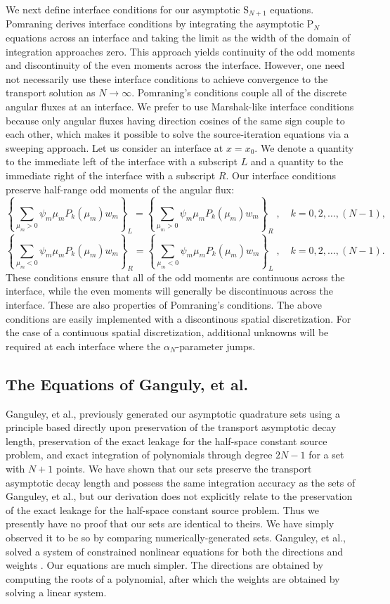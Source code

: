 \documentclass[12pt]{article}
\newcommand{\bracet}[1]{\left\{ #1 \right\}}
\newcommand{\be}{\begin{equation}}
\newcommand{\ee}{\end{equation}}
\newcommand{\pec}{\; ,}
\newcommand{\LEQ}[1]{\label{eq:#1}}
\newcommand{\bc}{\begin{center}}
\newcommand{\ec}{\end{center}}
\begin{document}
We next define interface conditions for our asymptotic S$_{N+1}$ equations.  Pomraning derives interface conditions  
by integrating the asymptotic P$_N$ equations across an interface and taking the limit as the width of the domain of 
integration approaches zero.  This approach yields continuity of the odd moments and discontinuity of the even moments across the 
interface.  However, one need not necessarily use these interface conditions to achieve convergence to the transport solution as 
$N \rightarrow \infty$.  Pomraning's conditions couple all of the discrete angular fluxes at an interface.  We prefer to use 
Marshak-like interface conditions because only angular fluxes having direction cosines of the same sign couple to each other, which makes 
it possible to solve the source-iteration equations via a sweeping approach. Let us consider an interface at $x=x_0$.  We denote a 
quantity to the immediate left of the interface with a subscript $L$ and a quantity to the immediate right of the interface with a 
subscript $R$. Our interface conditions preserve half-range odd moments of the angular flux:
\be
\bracet{\sum_{\mu_{m}>0} \psi_m \mu_m P_{k}(\mu_{m}) w_{m}}_L = 
\bracet{\sum_{\mu_{m}>0} \psi_m \mu_m P_{k}(\mu_{m}) w_{m}}_R \pec \quad k=0,2, \ldots, (N-1),
\LEQ{58}
\ee
\be
\bracet{ \sum_{\mu_{m}<0} \psi_m \mu_m P_{k}(\mu_{m}) w_{m}}_R = 
\bracet{ \sum_{\mu_{m}<0} \psi_m \mu_m P_{k}(\mu_{m}) w_{m}}_L
\pec \quad k=0,2, \ldots, (N-1).
\LEQ{59}
\ee
These conditions ensure that all of the odd moments are continuous across the interface, while the even moments will generally be 
discontinuous across the interface.  These are also properties of Pomraning's conditions.  The above conditions are easily implemented with 
a discontinous spatial discretization.  For the case of a continuous spatial discretization, additional unknowns will be required 
at each interface where the $\alpha_N$-parameter jumps.  

\subsection{The Equations of Ganguly, et al.}

Ganguley, et al., previously generated our asymptotic quadrature sets using a principle based directly 
upon preservation of the transport asymptotic decay length, preservation of the exact leakage for the half-space 
constant source problem, and exact integration of polynomials through degree $2N-1$ for a set with $N+1$ 
points. We have shown that our sets preserve the transport asymptotic decay length and possess the same integration 
accuracy as the sets of Ganguley, et al., but our derivation does not explicitly relate to the preservation of 
the exact leakage for the half-space constant source problem. Thus we presently have no proof that our sets are identical 
to theirs.  We have simply observed it to be so by comparing numerically-generated sets. Ganguley, et al., solved a system 
of constrained nonlinear equations for both the directions and weights \cite{ganguley}.  Our equations 
are much simpler. The directions are obtained by computing the roots of a polynomial, after which the weights are 
obtained by solving a linear system.
\end{document}

